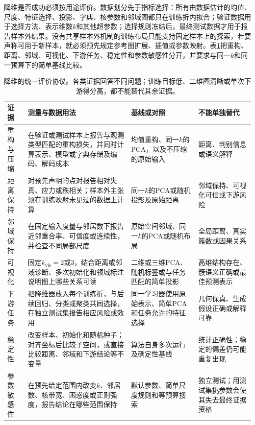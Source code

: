 降维是否成功必须按用途评价。数据划分先于指标选择：所有由数据估计的均值、尺度、特征选择、投影、字典、核参数和邻域图都只在训练折内拟合；验证数据用于选择方法、表示维数$k$和其他超参数；选择规则冻结后，最终测试数据才用于报告样本外结果。没有共享样本外机制的训练布局只能支持固定样本上的探索，若要声称可用于新样本，就必须预先规定参考图扩展、插值或参数映射。表\ref{tab:dim-evaluation-protocol}把重构、距离、邻域、可视化、下游任务、稳定性和参数敏感性分开，并要求与同一$k$和同一预算下的简单基线比较。

\begin{table}[!htbp]
  \centering
  \small
  \begin{tabularx}{\linewidth}{@{}>{\RaggedRight\arraybackslash}p{23mm}>{\RaggedRight\arraybackslash}p{58mm}XX@{}}
    \toprule
    证据 & 测量与数据用法 & 基线或对照 & 不能单独替代 \\
    \midrule
    重构与压缩
      & 在验证或测试样本上报告与观测类型匹配的重构损失，并同时计算表示、模型或字典存储及编码、解码成本
      & 均值重构、同一$k$的PCA，以及不压缩的原始输入
      & 距离、判别信息或语义解释 \\
    距离保持
      & 对预先声明的点对报告相对失真、应力或秩相关；样本外主张须在训练映射未见过的数据上计算
      & 同一$k$的PCA或随机投影及原始距离
      & 邻域保持、可视化可信或下游风险 \\
    邻域保持
      & 在固定输入度量与邻居数下报告近邻重合率、可信度或连续性，并检查不同局部尺度
      & 原始空间邻域、同一$k$的PCA或随机布局
      & 全局距离、真实簇数或因果关系 \\
    可视化
      & 固定$k_{\mathrm{vis}}=2$或$3$，结合距离或邻域诊断、多次初始化和领域标注说明图上哪些关系可读
      & 二维或三维PCA、随机标签或与任务匹配的简单投影
      & 高维结构存在、簇语义正确或最佳预测表示 \\
    下游任务
      & 把降维器放入每个训练折，与后续回归、分类或聚类共同选择，在独立测试集报告相应风险或效用
      & 同一学习器使用原始表示、简单PCA和任务允许的特征选择
      & 几何保真、生成假设正确或解释可靠 \\
    稳定性
      & 改变样本、初始化和随机种子；对齐坐标后比较子空间，或直接比较距离、邻域和下游结论等不变量
      & 算法自身多次运行及确定性基线
      & 统计正确性；稳定的偏差仍可能重复出现 \\
    参数敏感性
      & 在预先给定范围内改变$k$、邻居数、核带宽、困惑度或正则强度，报告结论在哪些范围保持
      & 默认参数、简单尺度规则和等预算搜索
      & 独立测试；用测试集挑参数会使其失去最终证据资格 \\
    \bottomrule
  \end{tabularx}
  \caption{降维的统一评价协议。各类证据回答不同问题；训练目标低、二维图清晰或单次下游得分高，都不能替代其余证据。}
  \label{tab:dim-evaluation-protocol}
\end{table}

